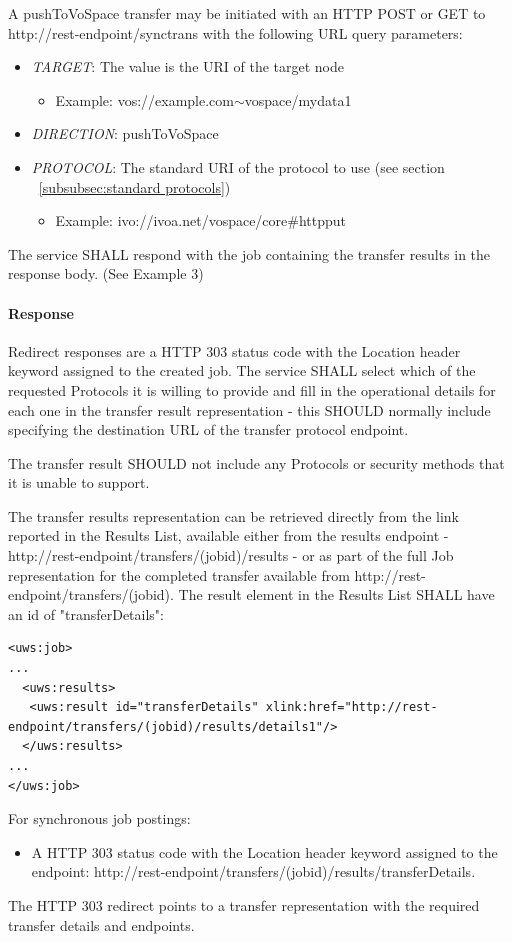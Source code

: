 \documentclass[11pt,a4paper]{ivoa}
\begin{document}
A pushToVoSpace transfer may be initiated with an HTTP POST or GET to http://rest-endpoint/synctrans with the following URL query parameters:
\begin{itemize}
    \item \emph{TARGET}: The value is the URI of the target node
        \begin{itemize}
           \item Example:  vos://example.com$\mathtt{\sim}$vospace/mydata1
        \end{itemize}
    \item \emph{DIRECTION}: pushToVoSpace
    \item \emph{PROTOCOL}: The standard URI of the protocol to use (see section ~\ref{subsubsec:standard protocols})
        \begin{itemize}
           \item Example: ivo://ivoa.net/vospace/core\#httpput
        \end{itemize}
\end{itemize}
The service SHALL respond with the job containing the transfer results in the response body.  (See Example 3)

\paragraph{Response}
Redirect responses are a HTTP 303 status code with the Location header keyword assigned to the created job.
The service SHALL select which of the requested Protocols it is willing to provide and fill in the operational details for each one in the transfer result representation - this SHOULD normally include specifying the destination URL of the transfer protocol endpoint.

The transfer result SHOULD not include any Protocols or security methods that it is unable to support.

The transfer results representation can be retrieved directly from the link reported in the Results List, available either from the results endpoint - http://rest-endpoint/transfers/(jobid)/results - or as part of the full Job representation for the completed transfer available from http://rest-endpoint/transfers/(jobid). The result element in the Results List SHALL have an id of "transferDetails":
\begin{lstlisting}
<uws:job>
...
  <uws:results>
   <uws:result id="transferDetails" xlink:href="http://rest-endpoint/transfers/(jobid)/results/details1"/>
  </uws:results>
...
</uws:job>
\end{lstlisting}
For synchronous job postings:
\begin{itemize}
    \item A HTTP 303 status code with the Location header keyword assigned to the endpoint: http://rest-endpoint/transfers/(jobid)/results/transferDetails.
\end{itemize}
The HTTP 303 redirect points to a transfer representation with the required transfer details and endpoints.
\end{document}
